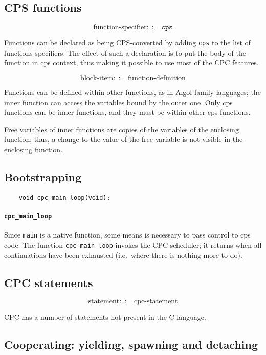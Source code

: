 \documentclass[a4paper]{report}
\begin{document}
\subsection{CPS functions} \label{sec:cpc-functions}

\[ \mbox{function-specifier} ::= \mathtt{cps} \]

Functions can be declared as being CPS-converted by adding {\tt cps}
to the list of functions specifiers.  The effect of such a declaration
is to put the body of the function in cps context, thus making it
possible to use most of the CPC features.

\[ \mbox{block-item} ::= \mbox{function-definition} \]

Functions can be defined within other functions, as in Algol-family
languages; the inner function can access the variables bound by the
outer one.  Only cps functions can be inner functions, and they must
be within other cps functions.

Free variables of inner functions are copies of the variables of the
enclosing function; thus, a change to the value of the free variable
is not visible in the enclosing function.

\subsection{Bootstrapping} \label{sec:bootstrapping}

\begin{verbatim}
    void cpc_main_loop(void);
\end{verbatim}

\paragraph{\tt cpc\_main\_loop} Since \verb|main| is a native
function, some means is necessary to pass control to cps code.  The
function \verb|cpc_main_loop| invokes the CPC scheduler; it returns
when all continuations have been exhausted (i.e.\ where there is
nothing more to do).

\subsection{CPC statements}

\[ \mbox{statement} ::= \mbox{cpc-statement} \]

CPC has a number of statements not present in the C language.

\subsection{Cooperating: yielding, spawning and detaching} \label{sec:cooperating}
\end{document}
